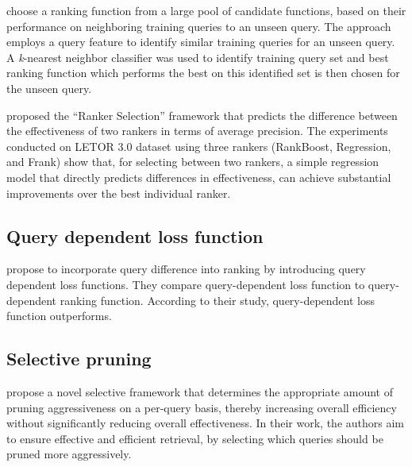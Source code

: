 \citet*{SelectRankingFunction} choose a ranking function from a large pool of candidate functions, based on their performance on neighboring training queries to an unseen query. The approach employs a query feature to identify similar training queries for an unseen query. A \emph{k}-nearest neighbor classifier was used to identify training query set and best ranking function which performs the best on this identified set is then chosen for the unseen query.

\citet*{lsr} proposed the ``Ranker Selection'' framework that predicts the difference between the effectiveness of two rankers in terms of average precision.
The experiments conducted on LETOR 3.0 dataset using three rankers (RankBoost, Regression, and Frank) show that, for selecting between two rankers, a simple regression model that directly predicts differences in effectiveness, can achieve substantial improvements over the best individual ranker.

\subsection{Query dependent loss function}
\citet*{QueryDependentLossFunction} propose to incorporate query difference into ranking by introducing query dependent loss functions. They compare query-dependent loss function to query-dependent ranking function. According to their study, query-dependent loss function outperforms. 

\subsection{Selective pruning}
\citet*{SelectivePruning} propose a novel selective framework that determines the appropriate amount of pruning aggressiveness on a per-query basis, thereby increasing overall efficiency without significantly reducing overall effectiveness. In their work, the authors aim to ensure effective and efficient retrieval, by selecting which queries should be pruned more aggressively.



 